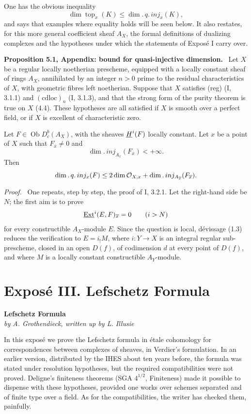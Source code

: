 \documentclass[11pt]{article}
\theoremstyle{plain}
\theoremstyle{definition}
\theoremstyle{remark}
\newenvironment{statement}[1]{\par\medskip\noindent\textbf{#1.}\ }{\par\medskip}
\newenvironment{prooftext}{\par\noindent\textit{Proof.}\ }{\par\medskip}
\DeclareMathOperator{\ob}{Ob}
\newcommand{\ol}[1]{\overline{#1}}
\begin{document}
One has the obvious inequality
\[
   \dim\operatorname{top}_x(K)\le \dim.\,q.\,inj_x(K),
\]
and says that examples where equality holds will be seen below. It also restates, for this more general coefficient sheaf $A_X$, the formal definitions of dualizing complexes and the hypotheses under which the statements of Exposé I carry over.

\begin{statement}{Proposition 5.1, Appendix: bound for quasi-injective dimension}
Let $X$ be a regular locally noetherian prescheme, equipped with a locally constant sheaf of rings $A_X$, annihilated by an integer $n>0$ prime to the residual characteristics of $X$, with geometric fibres left noetherian. Suppose that $X$ satisfies (reg) (I, 3.1.1) and $(\mathrm{cdloc})_n$ (I, 3.1.3), and that the strong form of the purity theorem is true on $X$ (4.4). These hypotheses are all satisfied if $X$ is smooth over a perfect field, or if $X$ is excellent of characteristic zero.

Let $F\in\ob D_c^b(A_X)$, with the sheaves $\underline{H}^i(F)$ locally constant. Let $x$ be a point of $X$ such that $F_{\ol x}\ne0$ and
\[
   \dim.\,inj_{A_{\ol x}}(F_{\ol x})<+\infty.
\]
Then
\[
   \dim.\,q.\,inj_x(F)
      \le 2\dim\cO_{X,x}+\dim.\,inj_{A_{\ol x}}(F_{\ol x}).
\]
\end{statement}

\begin{prooftext}
One repeats, step by step, the proof of I, 3.2.1. Let the right-hand side be $N$; the first aim is to prove
\[
   \uExt^i(E,F)_{\ol x}=0
      \qquad(i>N)
\]
for every constructible $A_X$-module $E$. Since the question is local, dévissage (1.3) reduces the verification to $E=i_!M$, where $i:Y\to X$ is an integral regular sub-prescheme, closed in an open $D(f)$, of codimension $d$ at every point of $D(f)$, and where $M$ is a locally constant constructible $A_Y$-module.
\end{prooftext}

\section*{Exposé III. Lefschetz Formula}

\begin{center}
\textbf{Lefschetz Formula}\\
\emph{by A. Grothendieck, written up by L. Illusie}
\end{center}

In this exposé we prove the Lefschetz formula in étale cohomology for correspondences between complexes of sheaves, in Verdier's formulation. In an earlier version, distributed by the IHES about ten years before, the formula was stated under resolution hypotheses, but the required compatibilities were not proved. Deligne's finiteness theorems (SGA $4^{1/2}$, Finiteness) made it possible to dispense with these hypotheses, provided one works over schemes separated and of finite type over a field. As for the compatibilities, the writer has checked them, painfully.
\end{document}
